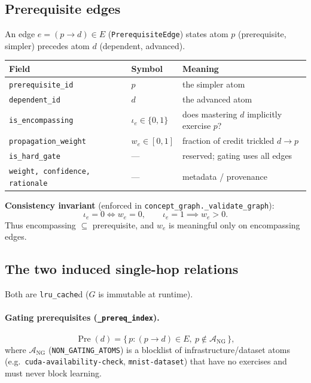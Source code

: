 \documentclass[11pt]{article}
\newcommand{\Pre}{\operatorname{Pre}}
\begin{document}
\subsection{Prerequisite edges}
An edge $e=(p\!\to\! d)\in E$ (\texttt{PrerequisiteEdge}) states atom $p$
(prerequisite, simpler) precedes atom $d$ (dependent, advanced).

\begin{center}
\begin{tabular}{@{}llp{7.6cm}@{}}
\toprule
Field & Symbol & Meaning \\
\midrule
\texttt{prerequisite\_id} & $p$ & the simpler atom \\
\texttt{dependent\_id} & $d$ & the advanced atom \\
\texttt{is\_encompassing} & $\iota_e\in\{0,1\}$ & does mastering $d$ implicitly exercise $p$? \\
\texttt{propagation\_weight} & $w_e\in[0,1]$ & fraction of credit trickled $d\to p$ \\
\texttt{is\_hard\_gate} & --- & reserved; gating uses all edges \\
\texttt{weight, confidence, rationale} & --- & metadata / provenance \\
\bottomrule
\end{tabular}
\end{center}

\noindent\textbf{Consistency invariant} (enforced in
\texttt{concept\_graph.\_validate\_graph}):
\[
  \iota_e = 0 \iff w_e = 0, \qquad \iota_e = 1 \implies w_e > 0 .
\]
Thus encompassing $\subseteq$ prerequisite, and $w_e$ is meaningful only on
encompassing edges.

\subsection{The two induced single-hop relations}
Both are \texttt{lru\_cache}d ($G$ is immutable at runtime).

\paragraph{Gating prerequisites (\texttt{\_prereq\_index}).}
\[
  \Pre(d) = \{\, p : (p\!\to\! d)\in E,\ p\notin\mathcal{A}_{\mathrm{NG}} \,\},
\]
where $\mathcal{A}_{\mathrm{NG}}$ (\texttt{NON\_GATING\_ATOMS}) is a blocklist of
infrastructure/dataset atoms (e.g.\ \texttt{cuda-availability-check},
\texttt{mnist-dataset}) that have no exercises and must never block learning.
\end{document}
